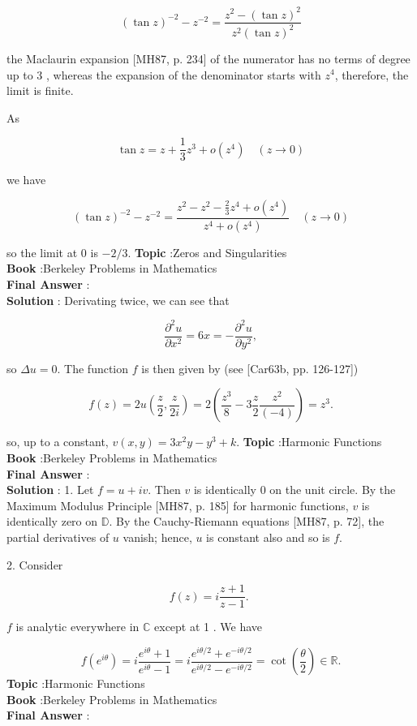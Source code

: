 \documentclass[10pt]{article}
\begin{document}
$$
(\tan z)^{-2}-z^{-2}=\frac{z^{2}-(\tan z)^{2}}{z^{2}(\tan z)^{2}}
$$

the Maclaurin expansion [MH87, p. 234] of the numerator has no terms of degree up to 3 , whereas the expansion of the denominator starts with $z^{4}$, therefore, the limit is finite.

As

$$
\tan z=z+\frac{1}{3} z^{3}+o\left(z^{4}\right) \quad(z \rightarrow 0)
$$

we have

$$
(\tan z)^{-2}-z^{-2}=\frac{z^{2}-z^{2}-\frac{2}{3} z^{4}+o\left(z^{4}\right)}{z^{4}+o\left(z^{4}\right)} \quad(z \rightarrow 0)
$$

so the limit at 0 is $-2 / 3$.
\textbf{Topic} :Zeros and Singularities \\
\textbf{Book} :Berkeley Problems in Mathematics\\
\textbf{Final Answer} :\\


\textbf{Solution} : Derivating twice, we can see that

$$
\frac{\partial^{2} u}{\partial x^{2}}=6 x=-\frac{\partial^{2} u}{\partial y^{2}},
$$

so $\Delta u=0$. The function $f$ is then given by (see [Car63b, pp. 126-127])

$$
f(z)=2 u\left(\frac{z}{2}, \frac{z}{2 i}\right)=2\left(\frac{z^{3}}{8}-3 \frac{z}{2} \frac{z^{2}}{(-4)}\right)=z^{3} .
$$

so, up to a constant, $v(x, y)=3 x^{2} y-y^{3}+k$.
\textbf{Topic} :Harmonic Functions \\
\textbf{Book} :Berkeley Problems in Mathematics\\
\textbf{Final Answer} :\\


\textbf{Solution} : 1. Let $f=u+i v$. Then $v$ is identically 0 on the unit circle. By the Maximum Modulus Principle [MH87, p. 185] for harmonic functions, $v$ is identically zero on $\mathbb{D}$. By the Cauchy-Riemann equations [MH87, p. 72], the partial derivatives of $u$ vanish; hence, $u$ is constant also and so is $f$.

2. Consider

$$
f(z)=i \frac{z+1}{z-1} \text {. }
$$

$f$ is analytic everywhere in $\mathbb{C}$ except at 1 . We have

$$
f\left(e^{i \theta}\right)=i \frac{e^{i \theta}+1}{e^{i \theta}-1}=i \frac{e^{i \theta / 2}+e^{-i \theta / 2}}{e^{i \theta / 2}-e^{-i \theta / 2}}=\cot \left(\frac{\theta}{2}\right) \in \mathbb{R} .
$$
\textbf{Topic} :Harmonic Functions \\
\textbf{Book} :Berkeley Problems in Mathematics\\
\textbf{Final Answer} :\\
\end{document}
